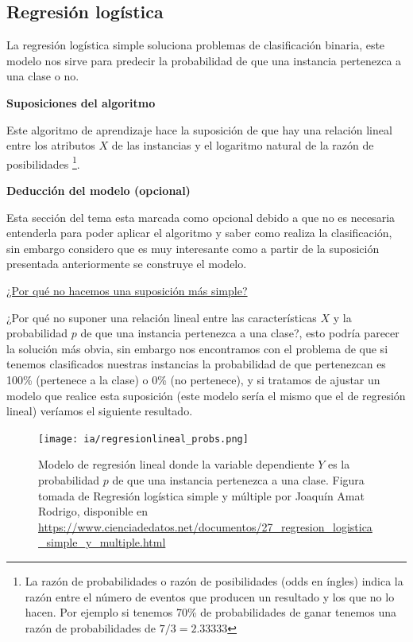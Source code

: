 \documentclass[11pt,fleqn]{book} %
\begin{document}
\subsection{Regresión logística} 

La regresión logística simple soluciona problemas de clasificación binaria, este modelo nos sirve para predecir la probabilidad de que una instancia pertenezca a una clase o no.

\textbf{Suposiciones del algoritmo}

Este algoritmo de aprendizaje hace la suposición de que hay una relación lineal entre los atributos $X$ de las instancias y el logaritmo natural de la razón de posibilidades \footnote{La razón de probabilidades o razón de posibilidades (odds en íngles) indica la razón entre el número de eventos que producen un resultado y los que no lo hacen.  Por ejemplo si tenemos 70\% de probabilidades de ganar tenemos una razón de probabilidades de $7/3 = 2.33333$ }. 

\textbf{Deducción del modelo (opcional)}

Esta sección del tema esta marcada como opcional debido a que no es necesaria entenderla para poder aplicar el algoritmo y saber como realiza la clasificación, sin embargo considero que es muy interesante como a partir de la suposición presentada anteriormente se construye el modelo.

\underline{¿Por qué no hacemos una suposición más simple?}

¿Por qué no suponer una relación lineal entre las características $X$ y la probabilidad $p$ de que una instancia pertenezca a una clase?, esto podría parecer la solución más obvia, sin embargo nos encontramos con el problema de que si tenemos clasificados nuestras instancias la probabilidad de que pertenezcan es 100\% (pertenece a la clase) o 0\% (no pertenece), y si tratamos de ajustar un modelo que realice esta suposición (este modelo sería el mismo que el de regresión lineal) veríamos el siguiente resultado.

\begin{figure}[ht]
\centering\texttt{[image: ia/regresionlineal\_probs.png]}
\caption{Modelo de regresión lineal donde la variable dependiente $Y$ es la probabilidad $p$ de que una instancia pertenezca a una clase. Figura tomada de  Regresión logística simple y múltiple por Joaquín Amat Rodrigo, disponible en \url{https://www.cienciadedatos.net/documentos/27_regresion_logistica_simple_y_multiple.html}}

\label{fig:regresionlineal_probs} 
\end{figure}
\end{document}
